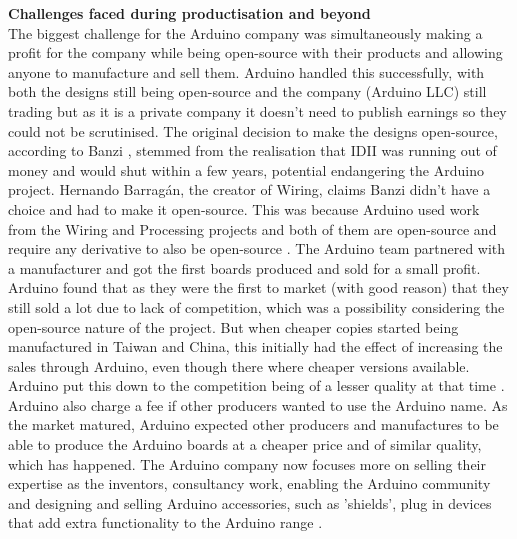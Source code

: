 \textbf{Challenges faced during productisation and beyond}\\
The biggest challenge for the Arduino company was simultaneously making a profit for the company while being open-source with their products and allowing anyone to manufacture and sell them. Arduino handled this successfully, with both the designs still being open-source and the company (Arduino LLC) still trading but as it is a private company it doesn't need to publish earnings so they could not be scrutinised. The original decision to make the designs open-source, according to Banzi 
\cite{RN111} \cite{RN103}, stemmed from the realisation that IDII was running out of money and would shut within a few years, potential endangering the Arduino project. Hernando Barragán, the creator of Wiring, claims Banzi didn't have a choice and had to make it open-source. This was because Arduino used work from the Wiring and Processing projects and both of them are open-source and require any derivative to also be open-source 
\cite{RN110}. The Arduino team partnered with a manufacturer and got the first boards produced and sold for a small profit. Arduino found that as they were the first to market (with good reason) that they still sold a lot due to lack of competition, which was a possibility considering the open-source nature of the project. But when cheaper copies started being manufactured in Taiwan and China, this initially had the effect of increasing the sales through Arduino, even though there where cheaper versions available. Arduino put this down to the competition being of a lesser quality at that time 
\cite{RN113}. Arduino also charge a fee if other producers wanted to use the Arduino name. As the market matured, Arduino expected other producers and manufactures to be able to produce the Arduino boards at a cheaper price and of similar quality, which has happened. The Arduino company now focuses more on selling their expertise as the inventors, consultancy work, enabling the Arduino community and designing and selling Arduino accessories, such as 'shields', plug in devices that add extra functionality to the Arduino range 
\cite{RN113}.\\

